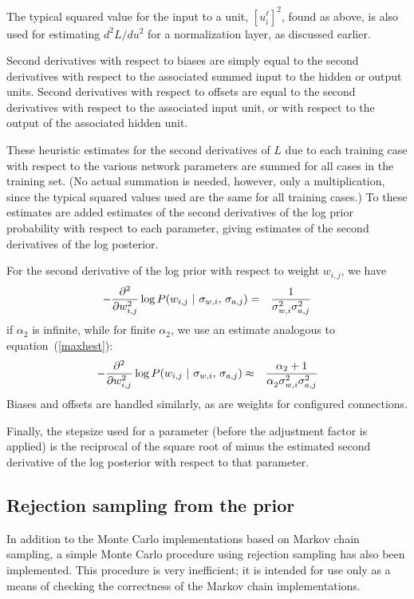 \documentclass{report}[11pt]
\def\beq{\begin{eqnarray}}
\def\eeq{\end{eqnarray}}
\begin{document}
The typical squared value for the input to a unit, $[u^{\ell}_i]^2$,
found as above, is also used for estimating $d^2L/du^2$ for a
normalization layer, as discussed earlier.

Second derivatives with respect to biases are simply equal to the
second derivatives with respect to the associated summed input to the
hidden or output units.  Second derivatives with respect to offsets
are equal to the second derivatives with respect to the associated
input unit, or with respect to the output of the associated hidden
unit.

These heuristic estimates for the second derivatives of $L$ due to
each training case with respect to the various network parameters are
summed for all cases in the training set.  (No actual summation is
needed, however, only a multiplication, since the typical squared
values used are the same for all training cases.)  To these estimates
are added estimates of the second derivatives of the log prior
probability with respect to each parameter, giving estimates of the
second derivatives of the log posterior.

For the second derivative of the log prior with respect to weight
$w_{i,j}$, we have\beq
  - {\partial^2 \over \partial w_{i,j}^2} 
      \log P(w_{i,j}\ |\ \sigma_{w,i},\,\sigma_{a,j}) 
    & = & {1 \over \sigma_{w,i}^2\sigma_{a,j}^2}
\eeq%
if $\alpha_2$ is infinite, while for finite $\alpha_2$, we use an
estimate analogous to equation~(\ref{maxhest}):\beq
 - {\partial^2 \over \partial w_{i,j}^2} 
      \log P(w_{i,j}\ |\ \sigma_{w,i},\,\sigma_{a,j}) 
   & \approx & {\alpha_2 + 1 \over \alpha_2^{\ } \sigma_{w,i}^2 \sigma_{a,j}^2} 
\eeq%
Biases and offsets are handled similarly, as are weights for 
configured connections.

Finally, the stepsize used for a parameter (before the adjustment
factor is applied) is the reciprocal of the square root of minus the
estimated second derivative of the log posterior with respect to that
parameter.


\subsection*{Rejection sampling from the prior}\label{app-rej}

In addition to the Monte Carlo implementations based on Markov chain
sampling, a simple Monte Carlo procedure using rejection sampling has
also been implemented.  This procedure is very inefficient; it is
intended for use only as a means of checking the correctness of the
Markov chain implementations.
\end{document}
